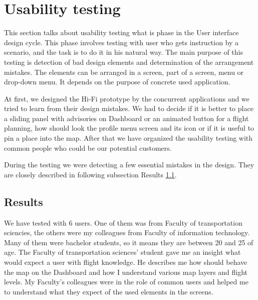 \section{Usability testing}\label{sec:usability-testing}
This section talks about usability testing what is phase in the User interface design cycle.
This phase involves testing with user who gets instruction by a scenario, and the task is to do it in his natural way.
The main purpose of this testing is detection of bad design elements and determination of the arrangement mistakes.
The elements can be arranged in a screen, part of a screen, menu or drop-down menu.
It depends on the purpose of concrete used application.

At first, we designed the Hi-Fi prototype by the concurrent applications and we tried to learn from their design mistakes.
We had to decide if it is better to place a sliding panel with advisories on Dashboard or an animated button for a flight planning, how should look the profile menu screen and its icon or if it is useful to pin a place into the map.
After that we have organized the usability testing with common people who could be our potential customers.

During the testing we were detecting a few essential mistakes in the design.
They are closely described in following subsection Results \ref{subsec:results}.

\subsection{Results}\label{subsec:results}
We have tested with 6 users.
One of them was from Faculty of transportation sciencies, the others were my colleagues from Faculty of information technology.
Many of them were bachelor students, so it means they are between 20 and 25 of age.
The Faculty of transportation sciences' student gave me an insight what would expect a user with flight knowledge.
He describes me how should behave the map on the Dashboard and how I understand various map layers and flight levels.
My Faculty's colleagues were in the role of common users and helped me to understand what they expect of the used elements in the screens.

